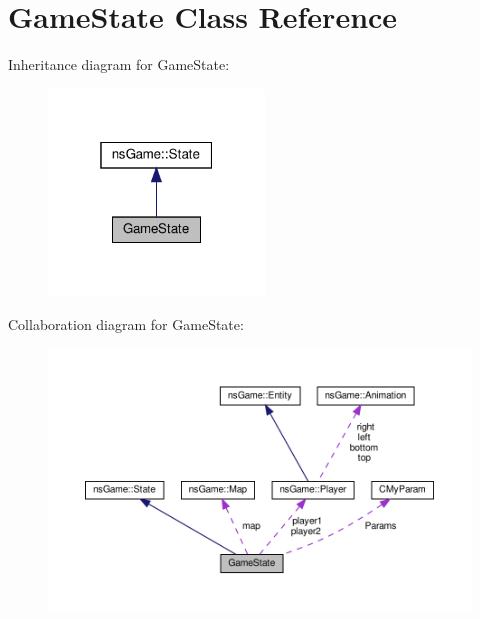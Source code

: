 \hypertarget{class_game_state}{}\section{Game\+State Class Reference}
\label{class_game_state}


Inheritance diagram for Game\+State\+:\nopagebreak
\begin{figure}[H]
\begin{center}
\leavevmode
\includegraphics[width=163pt]{class_game_state__inherit__graph}
\end{center}
\end{figure}


Collaboration diagram for Game\+State\+:\nopagebreak
\begin{figure}[H]
\begin{center}
\leavevmode
\includegraphics[width=350pt]{class_game_state__coll__graph}
\end{center}
\end{figure}
